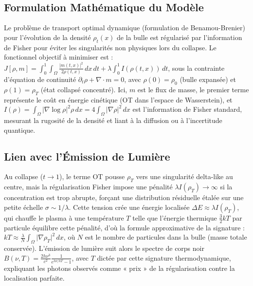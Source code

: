 \documentclass[a4paper,12pt]{article}
\begin{document}
\subsection{Formulation Mathématique du Modèle}
Le problème de transport optimal dynamique (formulation de Benamou-Brenier) pour l'évolution de la densité \( \rho_t(x) \) de la bulle est régularisé par l'information de Fisher pour éviter les singularités non physiques lors du collapse. Le fonctionnel objectif à minimiser est : \( J[\rho,m] = \int_0^1 \int_\Omega \frac{\vert m(t,x) \vert^2}{2 \rho(t,x)} \, dx \, dt + \lambda \int_0^1 I(\rho(t,x)) \, dt \), sous la contrainte d'équation de continuité \( \partial_t \rho + \nabla \cdot m = 0 \), avec \( \rho(0) = \rho_0 \) (bulle expansée) et \( \rho(1) = \rho_T \) (état collapsé concentré). Ici, \( m \) est le flux de masse, le premier terme représente le coût en énergie cinétique (OT dans l'espace de Wasserstein), et \( I(\rho) = \int_\Omega \vert \nabla \log \rho \vert^2 \rho \, dx = 4 \int_\Omega \vert \nabla \rho \vert^2 \, dx \) est l'information de Fisher standard, mesurant la rugosité de la densité et liant à la diffusion ou à l'incertitude quantique.
\subsection{Lien avec l'Émission de Lumière}
Au collapse (\( t \rightarrow 1 \)), le terme OT pousse \( \rho_T \) vers une singularité delta-like au centre, mais la régularisation Fisher impose une pénalité \( \lambda I(\rho_T) \rightarrow \infty \) si la concentration est trop abrupte, forçant une distribution résiduelle étalée sur une petite échelle \( \sigma \sim 1 / \lambda \). Cette tension crée une énergie localisée \( \Delta E \approx \lambda I(\rho_T) \), qui chauffe le plasma à une température \( T \) telle que l'énergie thermique \( \frac{3}{2} k T \) par particule équilibre cette pénalité, d'où la formule approximative de la signature : \( k T \approx \frac{\lambda}{N} \int_\Omega \vert \nabla \rho_T \vert^2 \, dx \), où \( N \) est le nombre de particules dans la bulle (masse totale conservée). L'émission de lumière suit alors le spectre de corps noir \( B(\nu, T) = \frac{2 h \nu^3}{c^2} \frac{1}{e^{h \nu / k T} - 1} \), avec \( T \) dictée par cette signature thermodynamique, expliquant les photons observés comme « prix » de la régularisation contre la localisation parfaite.
\end{document}
